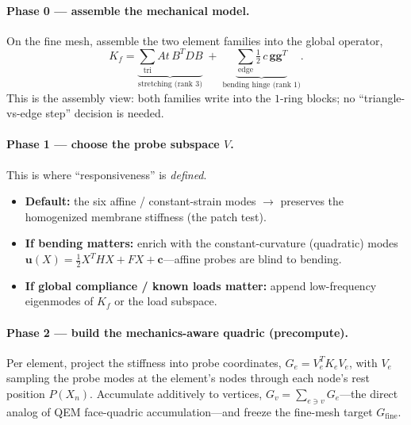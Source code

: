 \paragraph{Phase 0 --- assemble the mechanical model.}
On the fine mesh, assemble the two element families into the global operator,
\begin{equation}
  K_f = \underbrace{\sum_{\text{tri}} A t\,B^T D B}_{\text{stretching (rank 3)}}
      \;+\; \underbrace{\sum_{\text{edge}} \tfrac12\,c\,\mathbf{g}\mathbf{g}^T}_{\text{bending hinge (rank 1)}}.
\end{equation}
This is the assembly view: both families write into the $1$-ring blocks; no ``triangle-vs-edge step'' decision is needed.

\paragraph{Phase 1 --- choose the probe subspace $V$.}
This is where ``responsiveness'' is \emph{defined}.
\begin{itemize}
  \item \textbf{Default:} the six affine / constant-strain modes $\rightarrow$ preserves the homogenized membrane stiffness (the patch test).
  \item \textbf{If bending matters:} enrich with the constant-curvature (quadratic) modes $\mathbf{u}(X)=\tfrac12 X^T H X + FX + \mathbf{c}$---affine probes are blind to bending.
  \item \textbf{If global compliance / known loads matter:} append low-frequency eigenmodes of $K_f$ or the load subspace.
\end{itemize}

\paragraph{Phase 2 --- build the mechanics-aware quadric (precompute).}
Per element, project the stiffness into probe coordinates, $G_e = V_e^T K_e V_e$, with $V_e$ sampling the probe modes at the element's nodes through each node's rest position $P(X_n)$.
Accumulate additively to vertices, $G_v = \sum_{e \ni v} G_e$---the direct analog of QEM face-quadric accumulation---and freeze the fine-mesh target $G_{\text{fine}}$.

